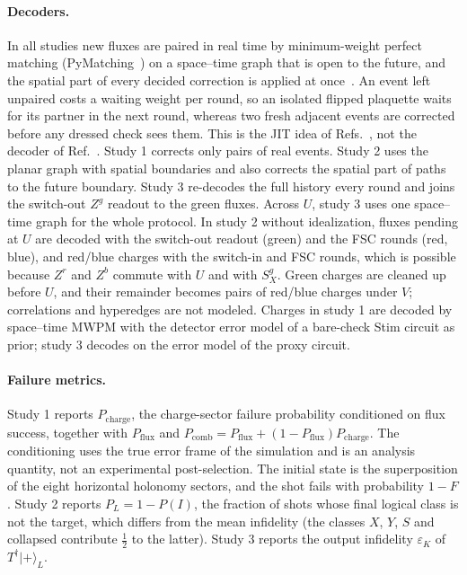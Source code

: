 \documentclass[a4paper]{article}
\providecommand{\ket}[1]{\ensuremath{|#1\rangle}}
\newcommand{\Pch}{P_{\mathrm{charge}}}
\newcommand{\Pfl}{P_{\mathrm{flux}}}
\newcommand{\epsK}{\varepsilon_K}
\begin{document}
\paragraph{Decoders.}
In all studies new fluxes are paired in real time by minimum-weight perfect matching (PyMatching~\cite{higgott2025pymatching}) on a space--time graph that is open to the future, and the spatial part of every decided correction is applied at once~\cite{bombin2018jit,brown2020jit,kobayashi2025clifford}. An event left unpaired costs a waiting weight per round, so an isolated flipped plaquette waits for its partner in the next round, whereas two fresh adjacent events are corrected before any dressed check sees them. This is the JIT idea of Refs.~\cite{kobayashi2025clifford,davydova2025knots}, not the decoder of Ref.~\cite{davydova2025knots}. Study 1 corrects only pairs of real events. Study 2 uses the planar graph with spatial boundaries and also corrects the spatial part of paths to the future boundary. Study 3 re-decodes the full history every round and joins the switch-out $Z^g$ readout to the green fluxes. Across $U$, study 3 uses one space--time graph for the whole protocol. In study 2 without idealization, fluxes pending at $U$ are decoded with the switch-out readout (green) and the FSC rounds (red, blue), and red/blue charges with the switch-in and FSC rounds, which is possible because $Z^r$ and $Z^b$ commute with $U$ and with $S^g_X$. Green charges are cleaned up before $U$, and their remainder becomes pairs of red/blue charges under $V$; correlations and hyperedges are not modeled. Charges in study 1 are decoded by space--time MWPM with the detector error model of a bare-check Stim circuit as prior; study 3 decodes on the error model of the proxy circuit.

\paragraph{Failure metrics.}
Study 1 reports $\Pch$, the charge-sector failure probability conditioned on flux success, together with $\Pfl$ and $P_{\mathrm{comb}}=\Pfl+(1-\Pfl)\Pch$. The conditioning uses the true error frame of the simulation and is an analysis quantity, not an experimental post-selection. The initial state is the superposition of the eight horizontal holonomy sectors, and the shot fails with probability $1-F$. Study 2 reports $P_L=1-P(I)$, the fraction of shots whose final logical class is not the target, which differs from the mean infidelity (the classes $X$, $Y$, $S$ and collapsed contribute $\tfrac12$ to the latter). Study 3 reports the output infidelity $\epsK$ of $T^\dagger\ket{+}_L$.
\end{document}
